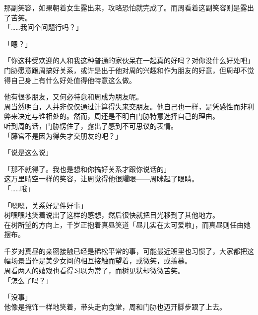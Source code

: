 那副笑容，如果朝着女生露出来，攻略恐怕就完成了。而周看着这副笑容则是露出了苦笑。\\

「……我问个问题行吗？」

「嗯？」

「你这种受欢迎的人和我这种普通的家伙呆在一起真的好吗？对你没什么好处吧」\\

门胁愿意跟周搞好关系，或许是出于他对周的兴趣和作为朋友的好意，但周却不觉得自己身上有什么好处值得他特意这么做。

他有很多朋友，又何必特意和周成为朋友呢。\\

周当然明白，人并非仅仅通过计算得失来交朋友。他自己也一样，是凭感性而非利弊来决定与谁相处的。然而，周还是不明白门胁特意选择自己的理由。\\

听到周的话，门胁愣住了，露出了感到不可思议的表情。\\

「藤宫不是因为得失才交朋友的吧？」

「说是这么说」

「那不就得了。我也是想和你搞好关系才跟你说话的」\\

这万里晴空一样的笑容，让周觉得他很耀眼——周眯起了眼睛。\\

「……哦」

「嗯嗯，关系好是件好事」\\

树嘿嘿地笑着说出了这样的感想，然后很快就把目光移到了其他地方。\\

在树所望的方向上，千岁正抱着真昼笑道「昼儿实在太可爱啦」，而真昼则任由她摆布。

千岁对真昼的亲密接触已经是稀松平常的事，可能最近班里也习惯了，大家都把这幅场景当作是美少女间的相互接触而望着，或微笑，或羡慕。\\

周看两人的嬉戏也看得习以为常了，而树见状却微微苦笑。\\

「怎么了吗？」

「没事」\\

他像是掩饰一样地笑着，带头走向食堂，周和门胁也迈开脚步跟了上去。\\

\vspace{2\baselineskip}

